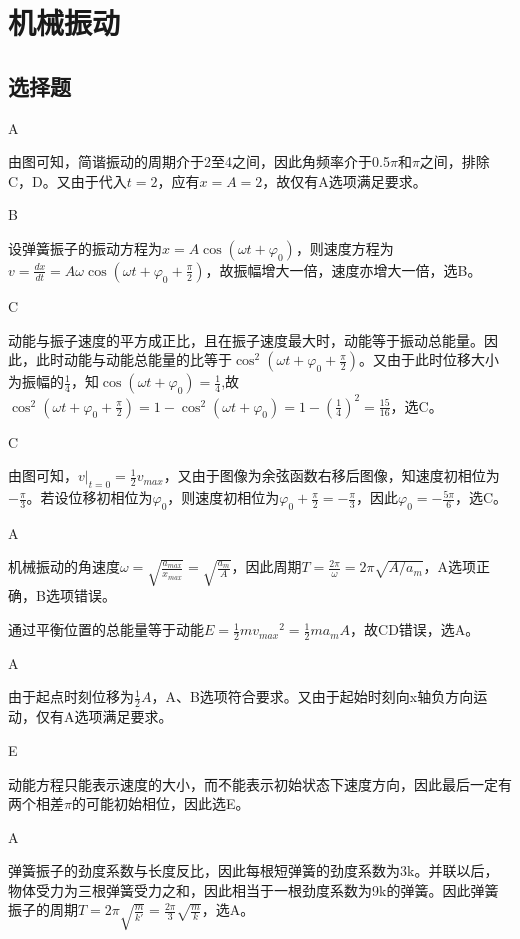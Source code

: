 \chapter{机械振动}
\section{选择题}
\exercise A

\solve
由图可知，简谐振动的周期介于2至4之间，因此角频率介于0.5$\pi$和$\pi$之间，排除C，D。又由于代入$t=2$，应有$x=A=2$，故仅有A选项满足要求。

\exercise B

\solve
设弹簧振子的振动方程为$x=A\cos(\omega t+\varphi_0)$，则速度方程为$v=\frac{dx}{dt}=A\omega\cos(\omega t+\varphi_0+\frac{\pi}{2})$，故振幅增大一倍，速度亦增大一倍，选B。

\exercise C

\solve
动能与振子速度的平方成正比，且在振子速度最大时，动能等于振动总能量。因此，此时动能与动能总能量的比等于$\cos^2(\omega t+\varphi_0+\frac{\pi}{2})$。又由于此时位移大小为振幅的$\frac{1}{4}$，知$\cos(\omega t+\varphi_0)=\frac{1}{4}$,故$\cos^2(\omega t+\varphi_0+\frac{\pi}{2})=1-\cos^2(\omega t+\varphi_0)=1-\left(\frac{1}{4}\right)^2=\frac{15}{16}$，选C。

\exercise C

\solve
由图可知，$v|_{t=0}=\frac{1}{2}v_{max}$，又由于图像为余弦函数右移后图像，知速度初相位为$-\frac{\pi}{3}$。若设位移初相位为$\varphi_0$，则速度初相位为$\varphi_0+\frac{\pi}{2}=-\frac{\pi}{3}$，因此$\varphi_0=-\frac{5\pi}{6}$，选C。

\exercise A

\solve
机械振动的角速度$\omega=\sqrt{\frac{a_{max}}{x_{max}}}=\sqrt{\frac{a_m}{A}}$，因此周期$T=\frac{2\pi}{\omega}=2\pi\sqrt{A/a_m}$，A选项正确，B选项错误。

通过平衡位置的总能量等于动能$E=\frac{1}{2}mv{_{max}}^2=\frac{1}{2}ma{_m}A$，故CD错误，选A。

\exercise A

\solve
由于起点时刻位移为$\frac{1}{2}A$，A、B选项符合要求。又由于起始时刻向x轴负方向运动，仅有A选项满足要求。

\exercise E

\solve
动能方程只能表示速度的大小，而不能表示初始状态下速度方向，因此最后一定有两个相差$\pi$的可能初始相位，因此选E。

\exercise A

\solve
弹簧振子的劲度系数与长度反比，因此每根短弹簧的劲度系数为3k。并联以后，物体受力为三根弹簧受力之和，因此相当于一根劲度系数为9k的弹簧。因此弹簧振子的周期$T=2\pi\sqrt{\frac{m}{k'}}=\frac{2\pi}{3}\sqrt{\frac{m}{k}}$，选A。

